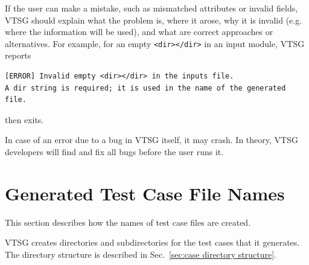 \documentclass[12pt]{article}
\begin{document}
If the user can make a mistake, such as mismatched attributes or invalid fields, VTSG
should explain what the problem is, where it arose, why it is invalid (e.g. where the
information will be used), and what are correct approaches or alternatives.  For
example, for an empty \verb|<dir></dir>| in an input module, VTSG reports
\begin{verbatim}
[ERROR] Invalid empty <dir></dir> in the inputs file.
A dir string is required; it is used in the name of the generated file.
\end{verbatim}
then exits.

In case of an error due to a bug in VTSG itself, it may crash.  In theory, VTSG
developers will find and fix all bugs before the user runs it.


\section{Generated Test Case File Names}

This section describes how the names of test case files are created.

VTSG creates directories and subdirectories for the test cases that it generates.
The directory structure is described in
Sec.~\ref{sec:case directory structure}.

\label{sec:case file name}
\end{document}
